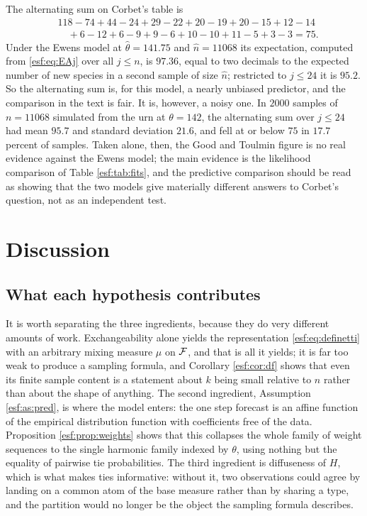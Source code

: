 \begin{example}
\label{esf:ex:goodtoulmin}
The alternating sum on Corbet's table is
\[
\begin{aligned}
&118 - 74 + 44 - 24 + 29 - 22 + 20 - 19 + 20 - 15 + 12 - 14 \\
&\quad + 6 - 12 + 6 - 9 + 9 - 6 + 10 - 10 + 11 - 5 + 3 - 3 = 75 .
\end{aligned}
\]
Under the Ewens model at $\hat\theta = 141.75$ and $\hat n = 11068$ its expectation, computed from
\eqref{esf:eq:EAj} over all $j \le n$, is $97.36$, equal to two decimals to the expected
number of new species in a second sample of size $\hat n$; restricted to $j \le 24$ it is $95.2$. So the
alternating sum is, for this model, a nearly unbiased predictor, and the comparison
in the text is fair. It is, however, a noisy one. In $2000$ samples of $n = 11068$
simulated from the urn at $\theta = 142$, the alternating sum over $j \le 24$ had mean
$95.7$ and standard deviation $21.6$, and fell at or below $75$ in $17.7$ percent of
samples. Taken alone, then, the Good and Toulmin figure is no real evidence against
the Ewens model; the main evidence is the likelihood comparison of Table
\ref{esf:tab:fits}, and the predictive comparison should be read as showing that the
two models give materially different answers to Corbet's question, not as an
independent test.
\end{example}

\section{Discussion}
\label{esf:sec:discussion}

\subsection{What each hypothesis contributes}

It is worth separating the three ingredients, because they do very different amounts
of work. Exchangeability alone yields the representation \eqref{esf:eq:definetti} with an
arbitrary mixing measure $\mu$ on $\mathcal{F}$, and that is all it yields; it is far too
weak to produce a sampling formula, and Corollary \ref{esf:cor:df} shows that even its
finite sample content is a statement about $k$ being small relative to $n$ rather than
about the shape of anything. The second ingredient, Assumption \ref{esf:as:pred}, is where
the model enters: the one step forecast is an affine function of the empirical
distribution function with coefficients free of the data. Proposition
\ref{esf:prop:weights} shows that this collapses the whole family of weight sequences to
the single harmonic family indexed by $\theta$, using nothing but the equality of
pairwise tie probabilities. The third ingredient is diffuseness of $H$, which is what
makes ties informative: without it, two observations could agree by landing on a
common atom of the base measure rather than by sharing a type, and the partition would
no longer be the object the sampling formula describes.


